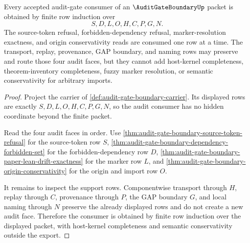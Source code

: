 \begin{theorem}
\label{thm:audit-gate-boundary-inductive-row}
Every accepted audit-gate consumer of an $\AuditGateBoundaryUp$ packet is obtained by finite row induction over
$$
S,D,L,O,H,C,P,G,N.
$$
The source-token refusal, forbidden-dependency refusal, marker-resolution exactness, and origin conservativity reads are consumed one row at a time. The transport, replay, provenance, GAP boundary, and naming rows may preserve and route those four audit faces, but they cannot add host-kernel completeness, theorem-inventory completeness, fuzzy marker resolution, or semantic conservativity for arbitrary imports.
\end{theorem}
\begin{proof}
Project the carrier of \autoref{def:audit-gate-boundary-carrier}. Its displayed rows are exactly $S,D,L,O,H,C,P,G,N$, so the audit consumer has no hidden coordinate beyond the finite packet.

Read the four audit faces in order. Use \autoref{thm:audit-gate-boundary-source-token-refusal} for the source-token row $S$, \autoref{thm:audit-gate-boundary-dependency-forbidden-set} for the forbidden-dependency row $D$, \autoref{thm:audit-gate-boundary-paper-lean-drift-exactness} for the marker row $L$, and \autoref{thm:audit-gate-boundary-origin-conservativity} for the origin and import row $O$.

It remains to inspect the support rows. Componentwise transport through $H$, replay through $C$, provenance through $P$, the GAP boundary $G$, and local naming through $N$ preserve the already displayed rows and do not create a new audit face. Therefore the consumer is obtained by finite row induction over the displayed packet, with host-kernel completeness and semantic conservativity outside the export.
\end{proof}

